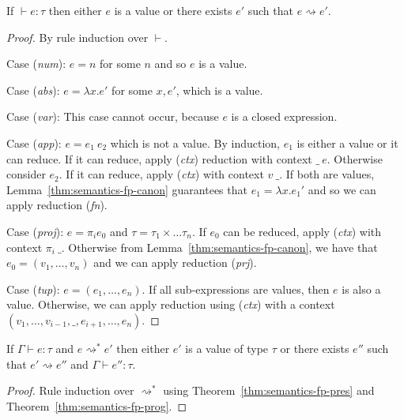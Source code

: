 \begin{theorem}[Progress]
\label{thm:semantics-fp-prog}
  If $\vdash e : \tau$ then either $e$ is a value or there exists $e'$ such that $e \rightsquigarrow e'$.
\end{theorem}
\begin{proof}
  By rule induction over $\vdash$.

\vspace{0.25em}\noindent\hangindent=0.6cm
Case (\emph{num}): $e = n$ for some $n$ and so $e$ is a value.

\vspace{0.25em}\noindent\hangindent=0.6cm
Case (\emph{abs}): $e = \lambda x.e'$ for some $x, e'$, which is a value.

\vspace{0.25em}\noindent\hangindent=0.6cm
Case (\emph{var}): This case cannot occur, because $e$ is a closed expression.

\vspace{0.25em}\noindent\hangindent=0.6cm
Case (\emph{app}): $e = e_1~e_2$ which is not a value. By induction, $e_1$ is either
a value or it can reduce. If it can reduce, apply (\emph{ctx}) reduction with context $\_~e$. Otherwise
consider $e_2$. If it can reduce, apply (\emph{ctx}) with context $v~\_$. If both are values,
Lemma~\ref{thm:semantics-fp-canon} guarantees that $e_1 = \lambda x.e_1'$ and so we can apply
reduction (\emph{fn}).

\vspace{0.25em}\noindent\hangindent=0.6cm
Case (\emph{proj}): $e = \pi_i e_0$ and $\tau=\tau_1\times\ldots\tau_n$. If $e_0$ can be reduced,
  apply (\emph{ctx}) with context $\pi_i~\_$. Otherwise from Lemma~\ref{thm:semantics-fp-canon},
  we have that $e_0=(v_1, \ldots, v_n)$ and we can apply reduction (\emph{prj}).

\vspace{0.25em}\noindent\hangindent=0.6cm
Case (\emph{tup}): $e = (e_1, \ldots, e_n)$. If all sub-expressions are values, then $e$ is also
  a value. Otherwise, we can apply reduction using (\emph{ctx}) with a context $(v_1, \ldots, v_{i-1}, \_, e_{i+1}, \ldots, e_n)$.
\end{proof}

\begin{theorem}
  If $\Gamma \vdash e : \tau$ and $e \rightsquigarrow^* e'$ then either $e'$ is a value of type $\tau$ or
  there exists $e''$ such that $e' \rightsquigarrow e''$ and $\Gamma \vdash e'' : \tau$.
\end{theorem}
\begin{proof}
  Rule induction over $\rightsquigarrow^*$ using Theorem~\ref{thm:semantics-fp-pres} and Theorem~\ref{thm:semantics-fp-prog}.
\end{proof}

